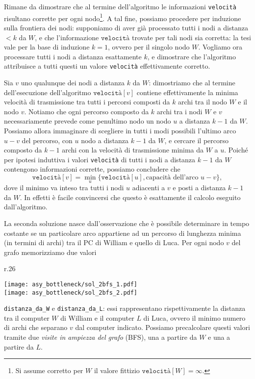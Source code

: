 Rimane da dimostrare che al termine dell'algoritmo le informazioni \texttt{velocità} risultano corrette per ogni nodo\footnote{Si assume corretto per $W$ il valore fittizio $\texttt{velocità}[W] = \infty$.}. A tal fine, possiamo procedere per induzione sulla frontiera dei nodi: supponiamo di aver già processato tutti i nodi a distanza $< k$ da $W$, e che l'informazione $\texttt{velocità}$ trovate per tali nodi sia corretta: la tesi vale per la base di induzione $k = 1$, ovvero per il singolo nodo $W$. Vogliamo ora processare tutti i nodi a distanza esattamente $k$, e dimostrare che l'algoritmo attribuisce a tutti questi un valore \texttt{velocità} effettivamente corretto.

Sia $v$ uno qualunque dei nodi a distanza $k$ da $W$: dimostriamo che al termine dell'esecuzione dell'algoritmo $\texttt{velocità}[v]$ contiene effettivamente la minima velocità di trasmissione tra tutti i percorsi composti da $k$ archi tra il nodo $W$ e il nodo $v$. Notiamo che ogni percorso composto da $k$ archi tra i nodi $W$ e $v$ necessariamente prevede come penultimo nodo un nodo $u$ a distanza $k-1$ da $W$. Possiamo allora immaginare di scegliere in tutti i modi possibili l'ultimo arco $u - v$ del percorso, con $u$ nodo a distanza $k-1$ da $W$, e cercare il percorso composto da $k-1$ archi con la velocità di trasmissione minima da $W$ a $u$. Poiché per ipotesi induttiva i valori \texttt{velocità} di tutti i nodi a distanza $k-1$ da $W$ contengono informazioni corrette, possiamo concludere che $$\texttt{velocità}[v] = \min_{u} \{\texttt{velocità}[u], \text{capacità dell'arco } u-v\},$$ dove il minimo va inteso tra tutti i nodi $u$ adiacenti a $v$ e posti a distanza $k-1$ da $W$. In effetti è facile convincersi che questo è esattamente il calcolo eseguito dall'algoritmo.

\SolDueBfs
La seconda soluzione nasce dall'osservazione che è possibile determinare in tempo costante se un particolare arco appartiene ad un percorso di lunghezza minima (in termini di archi) tra il PC di William e quello di Luca. Per ogni nodo $v$ del grafo memorizziamo due valori
\begin{wrapfigure}{r}{.26\textwidth}
  \vspace*{-.5cm}
  \begin{flushright}
		\texttt{[image: asy\_bottleneck/sol\_2bfs\_1.pdf]}\\
		\texttt{[image: asy\_bottleneck/sol\_2bfs\_2.pdf]}\\
	\end{flushright}
	\vspace*{-1.2cm}
\end{wrapfigure}
\texttt{distanza\_da\_W} e \texttt{distanza\_da\_L}: essi rappresentano rispettivamente la distanza tra il computer $W$ di William e il computer $L$ di Luca, ovvero il minimo numero di archi che separano $v$ dal computer indicato. Possiamo precalcolare questi valori tramite due \emph{visite in ampiezza del grafo} (BFS), una a partire da $W$ e una a partire da $L$.


